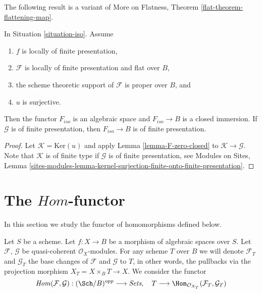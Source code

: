 \noindent
The following result is a variant of
More on Flatness, Theorem \ref{flat-theorem-flattening-map}.

\begin{lemma}
\label{lemma-F-iso-closed}
In Situation \ref{situation-iso}. Assume
\begin{enumerate}
\item $f$ is locally of finite presentation,
\item $\mathcal{F}$ is locally of finite presentation and flat over $B$,
\item the scheme theoretic support of $\mathcal{F}$ is proper over $B$, and
\item $u$ is surjective.
\end{enumerate}
Then the functor $F_{iso}$ is an algebraic space and $F_{iso} \to B$
is a closed immersion. If $\mathcal{G}$ is of finite presentation, then
$F_{iso} \to B$ is of finite presentation.
\end{lemma}

\begin{proof}
Let $\mathcal{K} = \text{Ker}(u)$ and apply Lemma \ref{lemma-F-zero-closed}
to $\mathcal{K} \to \mathcal{G}$. Note that $\mathcal{K}$ is of finite type
if $\mathcal{G}$ is of finite presentation, see
Modules on Sites, Lemma
\ref{sites-modules-lemma-kernel-surjection-finite-onto-finite-presentation}.
\end{proof}









\section{The $\mathit{Hom}$-functor}
\label{section-hom}

\noindent
In this section we study the functor of homomorphisms defined below.

\begin{situation}
\label{situation-hom}
Let $S$ be a scheme. Let $f : X \to B$ be a morphism of algebraic spaces
over $S$. Let $\mathcal{F}$, $\mathcal{G}$ be quasi-coherent
$\mathcal{O}_X$-modules. For any scheme $T$ over $B$ we will denote
$\mathcal{F}_T$ and $\mathcal{G}_T$ the base changes of
$\mathcal{F}$ and $\mathcal{G}$ to $T$, in other words, the pullbacks
via the projection morphism $X_T = X \times_B T \to X$.
We consider the functor
\begin{equation}
\label{equation-hom}
\mathit{Hom}(\mathcal{F}, \mathcal{G}) :
(\Sch/B)^{opp}
\longrightarrow
\textit{Sets},\quad
T
\longrightarrow
\Hom_{\mathcal{O}_{X_T}}(\mathcal{F}_T, \mathcal{G}_T)
\end{equation}
\end{situation}

